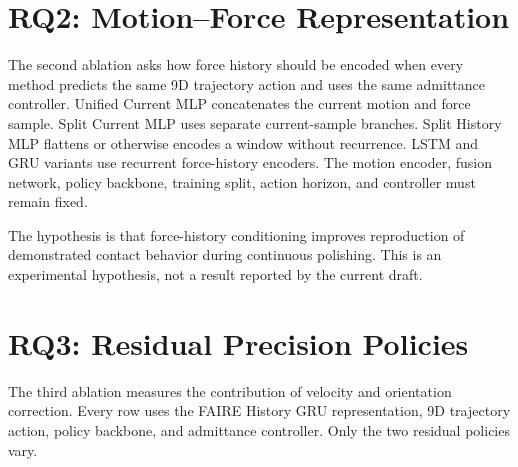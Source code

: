\section{RQ2: Motion--Force Representation}
The second ablation asks how force history should be encoded when every method predicts the same 9D trajectory action and uses the same admittance controller. Unified Current MLP concatenates the current motion and force sample. Split Current MLP uses separate current-sample branches. Split History MLP flattens or otherwise encodes a window without recurrence. LSTM and GRU variants use recurrent force-history encoders. The motion encoder, fusion network, policy backbone, training split, action horizon, and controller must remain fixed.

\begin{table}
\centering
\caption{Planned ablation of motion--force representation.}
\label{tab:force_trajectory_tracking}
\scriptsize
\setlength{\tabcolsep}{2.2pt}
\end{table}
\clearpage

The hypothesis is that force-history conditioning improves reproduction of demonstrated contact behavior during continuous polishing. This is an experimental hypothesis, not a result reported by the current draft.

\section{RQ3: Residual Precision Policies}
The third ablation measures the contribution of velocity and orientation correction. Every row uses the FAIRE History GRU representation, 9D trajectory action, policy backbone, and admittance controller. Only the two residual policies vary.

